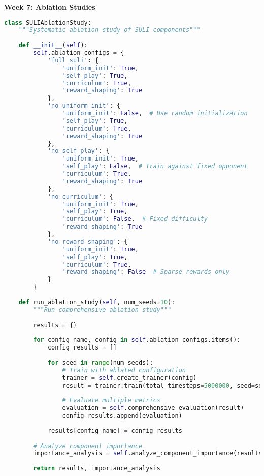 \documentclass[12pt,a4paper]{article}
\begin{document}
\textbf{Week 7: Ablation Studies}
\begin{lstlisting}[language=Python, caption=Comprehensive Ablation Studies]
class SULIAblationStudy:
    """Systematic ablation study of SULI components"""
    
    def __init__(self):
        self.ablation_configs = {
            'full_suli': {
                'uniform_init': True,
                'self_play': True,
                'curriculum': True,
                'reward_shaping': True
            },
            'no_uniform_init': {
                'uniform_init': False,  # Use random initialization
                'self_play': True,
                'curriculum': True,
                'reward_shaping': True
            },
            'no_self_play': {
                'uniform_init': True,
                'self_play': False,  # Train against fixed opponent
                'curriculum': True,
                'reward_shaping': True
            },
            'no_curriculum': {
                'uniform_init': True,
                'self_play': True,
                'curriculum': False,  # Fixed difficulty
                'reward_shaping': True
            },
            'no_reward_shaping': {
                'uniform_init': True,
                'self_play': True,
                'curriculum': True,
                'reward_shaping': False  # Sparse rewards only
            }
        }
    
    def run_ablation_study(self, num_seeds=10):
        """Run comprehensive ablation study"""
        
        results = {}
        
        for config_name, config in self.ablation_configs.items():
            config_results = []
            
            for seed in range(num_seeds):
                # Train with ablated configuration
                trainer = self.create_trainer(config)
                result = trainer.train(total_timesteps=5000000, seed=seed)
                
                # Evaluate multiple metrics
                evaluation = self.comprehensive_evaluation(result)
                config_results.append(evaluation)
            
            results[config_name] = config_results
        
        # Analyze component importance
        importance_analysis = self.analyze_component_importance(results)
        
        return results, importance_analysis
    

\end{lstlisting}
\end{document}
